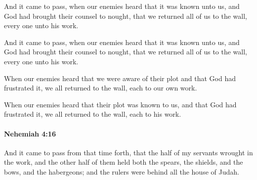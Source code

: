 			And it came to pass, when our enemies heard that it was known unto us, and God had brought their counsel to nought, that we returned all of us to the wall, every one unto his work.

			\begin{versebox}
					\item[BHS] 
					\item[LXX] 
					\item[ASV] And it came to pass, when our enemies heard that it was known unto us, and God had brought their counsel to nought, that we returned all of us to the wall, every one unto his work.
					\item[NIV] When our enemies heard that we were aware of their plot and that God had frustrated it, we all returned to the wall, each to our own work.
					\item[NRSV] When our enemies heard that their plot was known to us, and that God had frustrated it, we all returned to the wall, each to his work.
			\end{versebox}

		\paragraph{Nehemiah 4:16} %
			\label{NEHEMIAH-4-16}

			And it came to pass from that time forth, that the half of my servants wrought in the work, and the other half of them held both the spears, the shields, and the bows, and the habergeons; and the rulers were behind all the house of Judah.

